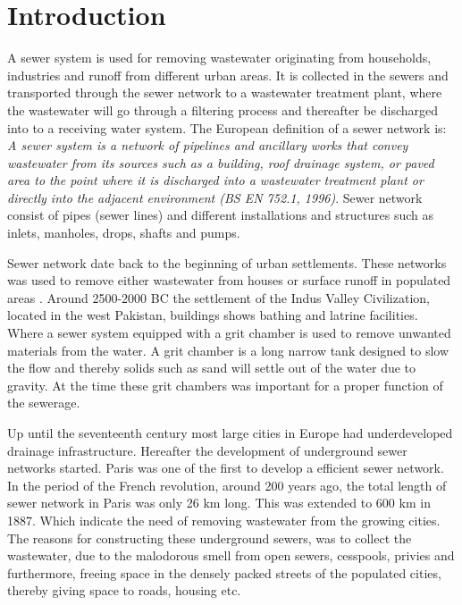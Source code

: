 \chapter{Introduction}
\label{ch:introduction}
A sewer system is used for removing wastewater originating from households, industries and runoff from different urban areas. It is collected in the sewers and transported through the sewer network to a wastewater treatment plant, where the wastewater will go through a filtering process and thereafter be discharged into to a receiving water system. The European definition of a sewer network is: \textit{A sewer system is a network of pipelines and ancillary works that convey wastewater from its sources such as a building, roof drainage system, or paved area to the point where it is discharged into a wastewater treatment plant or directly into the adjacent environment (BS EN 752.1, 1996)}. Sewer network consist of pipes (sewer lines) and different installations and structures such as inlets, manholes, drops, shafts and pumps.   

Sewer network date back to the beginning of urban settlements. These networks was used to remove either wastewater from houses or surface runoff in populated areas . Around 2500-2000 BC the settlement of the Indus Valley Civilization, located in the west Pakistan, buildings shows bathing and latrine facilities. Where a sewer system equipped with a grit chamber is used to remove unwanted materials from the water. A grit chamber is a long narrow tank designed to slow the flow and thereby solids such as sand will settle out of the water due to gravity. At the time these grit chambers was important for a proper function of the sewerage.      

Up until the seventeenth century most large cities in Europe had underdeveloped drainage infrastructure. Hereafter the development of underground sewer networks started. Paris was one of the first to develop a efficient sewer network. In the period of the French revolution, around 200 years ago, the total length of sewer network in Paris was only 26 km long. This was extended to 600 km in 1887. Which indicate the need of removing wastewater from the growing cities. The reasons for constructing these underground sewers, was to collect the wastewater, due to the malodorous smell from open sewers, cesspools, privies and furthermore, freeing space in the densely packed streets of the populated cities, thereby giving space to roads, housing etc.  





